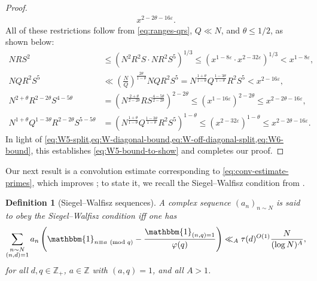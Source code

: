 \documentclass[reqno,11pt]{amsart}
\newtheorem{definition}[theorem]{Definition}
\theoremstyle{remark}
\numberwithin{equation}{section}
\newcommand{\Z}{\mathbb{Z}}
\newcommand{\one}{\mathbbm{1}}
\newcommand{\eps}{\varepsilon}
\renewcommand{\pmod}[1]{\ (\textnormal{mod } #1)}
\begin{document}
\begin{proof}
\[\begin{gathered}
    x^{2-2\theta-16\eps}.
\end{gathered}
\]
All of these restrictions follow from \cref{eq:ranges-qrs}, $Q \ll N$, and $\theta \le 1/2$, as shown below:
\[
\begin{aligned}
    NRS^2 &\le \left(N^2 R^2 S \cdot N R^2 S^5 \right)^{1/3}
    \le 
    \left(x^{1-8\eps} \cdot x^{2-32\eps}\right)^{1/3}
    < 
    x^{1-8\eps},
    \\
    N Q R^2 S^5
    &\ll 
    \left(\frac{N}{Q}\right)^{\frac{2\theta}{1-\theta}} N Q R^2 S^5
    =
    N^{\frac{1+\theta}{1-\theta}} Q^{\frac{1-3\theta}{1-\theta}} R^2 S^5
    < 
    x^{2-16\eps},
    \\
    N^{2+\theta} R^{2-2\theta} S^{4-5\theta} 
    &= 
    \left(N^{\frac{2+\theta}{2-2\theta}} R S^{\frac{4-5\theta}{2-2\theta}}\right)^{2-2\theta}
    \le 
    (x^{1-16\eps})^{2-2\theta}
    \le 
    x^{2-2\theta-16\eps},
    \\
    N^{1+\theta} Q^{1-3\theta} R^{2-2\theta} S^{5-5\theta}
    &= 
    \left(N^{\frac{1+\theta}{1-\theta}} Q^{\frac{1-3\theta}{1-\theta}} R^{2} S^5\right)^{1-\theta}
    \le 
    (x^{2-32\eps})^{1-\theta}
    \le 
    x^{2-2\theta-16\eps}.
\end{aligned}
\]
In light of \cref{eq:W5-split,eq:W-diagonal-bound,eq:W-off-diagonal-split,eq:W6-bound}, this establishes \cref{eq:W5-bound-to-show} and completes our proof.
\end{proof}


Our next result is a convolution estimate corresponding to \cref{eq:conv-estimate-primes}, which improves \cite[Proposition 7.2]{maynard2025primes2}; to state it, we recall the Siegel--Walfisz condition from \cite[Definition 3]{maynard2025primes2}.

\begin{definition}[Siegel--Walfisz sequences] \label{def:siegel-walfisz}
A complex sequence $(a_n)_{n \sim N}$ is said to obey the \emph{Siegel--Walfisz condition} iff one has
\[
    \sum_{\substack{n \sim N \\ (n, d) = 1}} a_n \left(\one_{n \equiv a \pmod{q}} - \frac{\one_{(n, q) = 1}}{\varphi(q)} \right)
    \ll_A 
    \tau(d)^{O(1)} \frac{N}{(\log N)^A},
\]
for all $d, q \in \Z_+$, $a \in \Z$ with $(a, q) = 1$, and all $A > 1$.
\end{definition}
\end{document}
